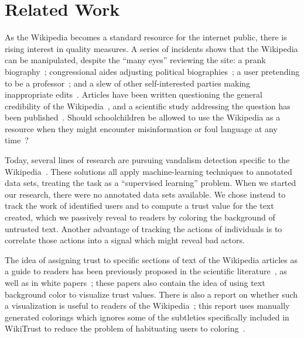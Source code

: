 \section{Related Work}

As the Wikipedia becomes a standard resource for the internet
public, there is rising interest in quality measures.
A series of incidents shows that the Wikipedia can be manipulated,
despite the ``many eyes'' reviewing the site:
a prank biography~\cite{Seigenthaler05,NewYorkTimes05a,NewYorkTimes05b};
congressional aides adjusting political
biographies~\cite{Lehmann2006,NewZelandHerald06,Davis2006};
a user pretending to be a professor~\cite{BBC07};
and a slew of other self-interested parties making
inappropriate edits~\cite{Wired07,Wikiscanner07,Noguchi2008}.
Articles have been written questioning the
general credibility of the Wikipedia~\cite{Stross2006,Schiff2006},
and a scientific study addressing the question
has been published~\cite{Giles2005}.
Should schoolchildren be allowed to use the Wikipedia as
a resource when they might encounter misinformation or foul
language at any time~\cite{Gralla2007,Olanoff2007}?

Today, several lines of research are pursuing
vandalism detection specific to the Wikipedia~\cite{Potthast2010b}.
These solutions all apply machine-learning techniques
to annotated data sets, treating the task as a
``supervised learning'' problem.
When we started our research, there were no annotated
data sets available.
We chose instead to track the work of identified users and to compute a
trust value for the text created, which we passively reveal to readers
by coloring the background of untrusted text.
Another advantage of tracking the actions of individuals is to correlate
those actions into a signal which might reveal bad actors.

The idea of assigning trust to specific sections of text of the Wikipedia
articles as a guide to readers has been previously proposed in the scientific
literature~\cite{WikiMTWtrust06,Cross2006,McGuinness06}, as well as in white
papers~\cite{King2007}; these papers also contain
the idea of using text background color to visualize trust values.
There is also a report on whether such a visualization is useful
to readers of the Wikipedia~\cite{Lucassen2011}; this report uses
manually generated colorings which ignores some of the subtleties
specifically included in WikiTrust to reduce the problem of
habituating users to coloring~\cite{Adler2007}.


